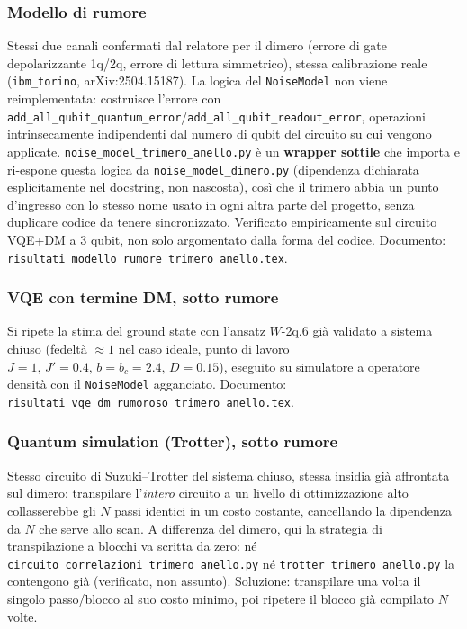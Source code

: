 \documentclass[11pt,a4paper]{article}
\begin{document}
\subsubsection{Modello di rumore}
\label{subsec:modello}

Stessi due canali confermati dal relatore per il dimero (errore di gate
depolarizzante 1q/2q, errore di lettura simmetrico), stessa calibrazione
reale (\texttt{ibm\_torino}, arXiv:2504.15187). La logica del
\texttt{NoiseModel} non viene reimplementata: costruisce l'errore con
\texttt{add\_all\_qubit\_\allowbreak quantum\_error}/\texttt{add\_all\_qubit\_\allowbreak readout\_error},
operazioni intrinsecamente indipendenti dal numero di qubit del circuito
su cui vengono applicate. \texttt{noise\_model\_\allowbreak trimero\_anello.py} è un
\textbf{wrapper sottile} che importa e ri-espone questa logica da
\texttt{noise\_model\_dimero.py} (dipendenza dichiarata esplicitamente
nel docstring, non nascosta), così che il trimero abbia un punto
d'ingresso con lo stesso nome usato in ogni altra parte del progetto,
senza duplicare codice da tenere sincronizzato. Verificato empiricamente
sul circuito VQE+DM a 3 qubit, non solo argomentato dalla forma del
codice. Documento:
\texttt{risultati\_\allowbreak modello\_rumore\_\allowbreak trimero\_anello.tex}.

\subsubsection{VQE con termine DM, sotto rumore}

Si ripete la stima del ground state con l'ansatz $W$-2q.6 già validato a
sistema chiuso (fedeltà $\approx1$ nel caso ideale, punto di lavoro
$J=1,\,J'=0.4,\,b=b_c=2.4,\,D=0.15$), eseguito su simulatore a operatore
densità con il \texttt{NoiseModel} agganciato. Documento:
\texttt{risultati\_vqe\_dm\_\allowbreak rumoroso\_trimero\_anello.tex}.

\subsubsection{Quantum simulation (Trotter), sotto rumore}
\label{subsec:trotter}

Stesso circuito di Suzuki--Trotter del sistema chiuso, stessa insidia
già affrontata sul dimero: transpilare l'\emph{intero} circuito a un
livello di ottimizzazione alto collasserebbe gli $N$ passi identici in
un costo costante, cancellando la dipendenza da $N$ che serve allo scan.
A differenza del dimero, qui la strategia di transpilazione a blocchi
va scritta da zero: né
\texttt{circuito\_\allowbreak correlazioni\_\allowbreak trimero\_anello.py}
né \texttt{trotter\_trimero\_anello.py} la contengono già (verificato,
non assunto). Soluzione: transpilare una volta il singolo passo/blocco
al suo costo minimo, poi ripetere il blocco già compilato $N$ volte.
\end{document}
